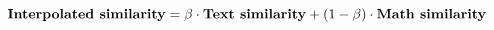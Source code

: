 \begin{equation}
  \text{\textbf{Interpolated similarity}} =
    \beta\cdot\text{\textbf{Text similarity}} +
    (1 - \beta)\cdot\text{\textbf{Math similarity}}
\end{equation}
